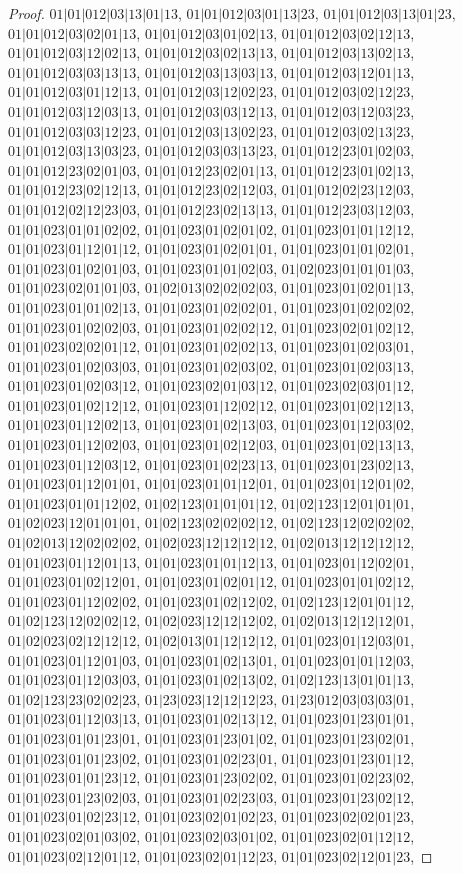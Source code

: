 \documentclass[12pt]{article}
\theoremstyle{plain}
\theoremstyle{definition}
\theoremstyle{remark}
\begin{document}
\begin{proof}
$01|01|012|03|13|01|13$, $01|01|012|03|01|13|23$, $01|01|012|03|13|01|23$, $01|01|012|03|02|01|13$, $01|01|012|03|01|02|13$, $01|01|012|03|02|12|13$, $01|01|012|03|12|02|13$, $01|01|012|03|02|13|13$, $01|01|012|03|13|02|13$, $01|01|012|03|03|13|13$, $01|01|012|03|13|03|13$, $01|01|012|03|12|01|13$, $01|01|012|03|01|12|13$, $01|01|012|03|12|02|23$, $01|01|012|03|02|12|23$, $01|01|012|03|12|03|13$, $01|01|012|03|03|12|13$, $01|01|012|03|12|03|23$, $01|01|012|03|03|12|23$, $01|01|012|03|13|02|23$, $01|01|012|03|02|13|23$, $01|01|012|03|13|03|23$, $01|01|012|03|03|13|23$, $01|01|012|23|01|02|03$, $01|01|012|23|02|01|03$, $01|01|012|23|02|01|13$, $01|01|012|23|01|02|13$, $01|01|012|23|02|12|13$, $01|01|012|23|02|12|03$, $01|01|012|02|23|12|03$, $01|01|012|02|12|23|03$, $01|01|012|23|02|13|13$, $01|01|012|23|03|12|03$, $01|01|023|01|01|02|02$, $01|01|023|01|02|01|02$, $01|01|023|01|01|12|12$, $01|01|023|01|12|01|12$, $01|01|023|01|02|01|01$, $01|01|023|01|01|02|01$, $01|01|023|01|02|01|03$, $01|01|023|01|01|02|03$, $01|02|023|01|01|01|03$, $01|01|023|02|01|01|03$, $01|02|013|02|02|02|03$, $01|01|023|01|02|01|13$, $01|01|023|01|01|02|13$, $01|01|023|01|02|02|01$, $01|01|023|01|02|02|02$, $01|01|023|01|02|02|03$, $01|01|023|01|02|02|12$, $01|01|023|02|01|02|12$, $01|01|023|02|02|01|12$, $01|01|023|01|02|02|13$, $01|01|023|01|02|03|01$, $01|01|023|01|02|03|03$, $01|01|023|01|02|03|02$, $01|01|023|01|02|03|13$, $01|01|023|01|02|03|12$, $01|01|023|02|01|03|12$, $01|01|023|02|03|01|12$, $01|01|023|01|02|12|12$, $01|01|023|01|12|02|12$, $01|01|023|01|02|12|13$, $01|01|023|01|12|02|13$, $01|01|023|01|02|13|03$, $01|01|023|01|12|03|02$, $01|01|023|01|12|02|03$, $01|01|023|01|02|12|03$, $01|01|023|01|02|13|13$, $01|01|023|01|12|03|12$, $01|01|023|01|02|23|13$, $01|01|023|01|23|02|13$, $01|01|023|01|12|01|01$, $01|01|023|01|01|12|01$, $01|01|023|01|12|01|02$, $01|01|023|01|01|12|02$, $01|02|123|01|01|01|12$, $01|02|123|12|01|01|01$, $01|02|023|12|01|01|01$, $01|02|123|02|02|02|12$, $01|02|123|12|02|02|02$, $01|02|013|12|02|02|02$, $01|02|023|12|12|12|12$, $01|02|013|12|12|12|12$, $01|01|023|01|12|01|13$, $01|01|023|01|01|12|13$, $01|01|023|01|12|02|01$, $01|01|023|01|02|12|01$, $01|01|023|01|02|01|12$, $01|01|023|01|01|02|12$, $01|01|023|01|12|02|02$, $01|01|023|01|02|12|02$, $01|02|123|12|01|01|12$, $01|02|123|12|02|02|12$, $01|02|023|12|12|12|02$, $01|02|013|12|12|12|01$, $01|02|023|02|12|12|12$, $01|02|013|01|12|12|12$, $01|01|023|01|12|03|01$, $01|01|023|01|12|01|03$, $01|01|023|01|02|13|01$, $01|01|023|01|01|12|03$, $01|01|023|01|12|03|03$, $01|01|023|01|02|13|02$, $01|02|123|13|01|01|13$, $01|02|123|23|02|02|23$, $01|23|023|12|12|12|23$, $01|23|012|03|03|03|01$, $01|01|023|01|12|03|13$, $01|01|023|01|02|13|12$, $01|01|023|01|23|01|01$, $01|01|023|01|01|23|01$, $01|01|023|01|23|01|02$, $01|01|023|01|23|02|01$, $01|01|023|01|01|23|02$, $01|01|023|01|02|23|01$, $01|01|023|01|23|01|12$, $01|01|023|01|01|23|12$, $01|01|023|01|23|02|02$, $01|01|023|01|02|23|02$, $01|01|023|01|23|02|03$, $01|01|023|01|02|23|03$, $01|01|023|01|23|02|12$, $01|01|023|01|02|23|12$, $01|01|023|02|01|02|23$, $01|01|023|02|02|01|23$, $01|01|023|02|01|03|02$, $01|01|023|02|03|01|02$, $01|01|023|02|01|12|12$, $01|01|023|02|12|01|12$, $01|01|023|02|01|12|23$, $01|01|023|02|12|01|23$, 
\end{proof}
\end{document}
